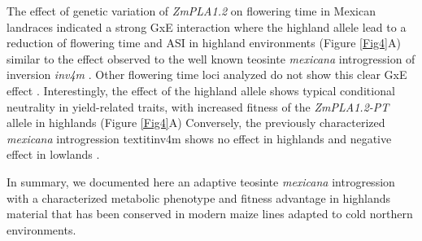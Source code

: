 \documentclass[9pt,twocolumn,twoside,lineno]{BioRxiv}
\begin{document}
The effect of genetic variation of \textit{ZmPLA1.2} on flowering time in Mexican landraces indicated a strong GxE interaction where the highland allele lead to a reduction of flowering time and ASI in highland environments (Figure \ref{Fig4}A) similar to the effect observed to the well known teosinte \textit{mexicana} introgression of inversion \textit{inv4m} \cite{Crow2020-gene}.
Other flowering time loci analyzed do not show this clear GxE effect \cite{Gates2019-xu}.
Interestingly, the effect of the highland allele shows typical conditional neutrality in yield-related traits, with increased fitness of the \textit{ZmPLA1.2-PT} allele in highlands (Figure \ref{Fig4}A)
Conversely, the previously characterized \textit{mexicana} introgression textit{inv4m} \cite{Gonzalez-Segovia2019-jy, pyhajarvi2013, Hufford2013-gs} shows no effect in highlands and negative effect in lowlands \cite{Crow2020-gene}.

In summary, we documented here an adaptive teosinte \textit{mexicana} introgression with a characterized metabolic phenotype and fitness advantage in highlands material that has been conserved in modern maize lines adapted to cold northern environments. 

\end{document}
